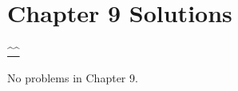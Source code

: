 \section{Chapter 9 Solutions}
\begin{center}\hyperref[toc]{\^{}\^{}}\end{center}
\setcounter{problem}{0}
\setcounter{solution}{0}
No problems in Chapter 9.